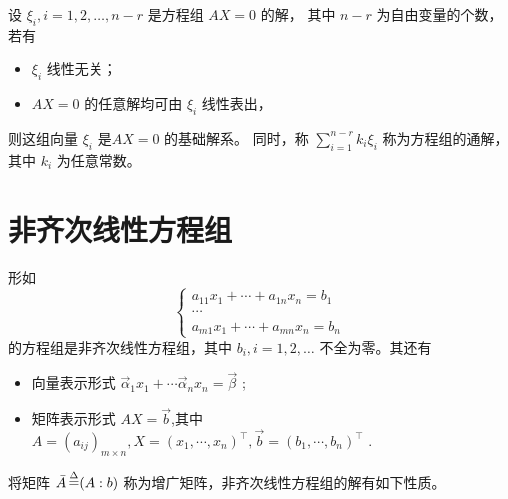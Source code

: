
设 $ \xi_i,i=1,2,\dots,n-r $ 是方程组 $ AX = 0 $ 的解，
其中 $ n - r $ 为自由变量的个数，
若有
\begin{itemize}
    \item $ \xi_i $ 线性无关；
    \item $ AX=0 $ 的任意解均可由 $ \xi_i $ 线性表出，
\end{itemize}
则这组向量 $ \xi_i $ 是$ AX = 0 $ 的基础解系。
同时，称 $ \sum_{i=1}^{n-r}k_i\xi_{i} $ 称为方程组的通解，
其中 $ k_i $ 为任意常数。

\section{非齐次线性方程组}

形如
\begin{equation*}
    \left\{
    \begin{array}{c}
        a_{11}x_1 + \cdots +a_{1n}x_n = b_1\\ 
        \cdots\\ 
        a_{m1}x_1 + \cdots +a_{mn}x_n = b_n
    \end{array}
    \right.
\end{equation*}
的方程组是非齐次线性方程组，其中 $ b_i,i=1,2,\dots $ 不全为零。其还有
\begin{itemize}
    \item 向量表示形式
    $ \vec \alpha_1x_1+\cdots \vec\alpha_n x_n = \vec \beta $ ;
    \item 矩阵表示形式
    $ AX = \vec b$,其中 $ A = (a_{ij})_{m\times n}, X = (x_1,\cdots, x_n)^\top ,\vec b = (b_1,\cdots,b_n)^\top$ .
\end{itemize}


将矩阵 $ \bar A\mathop=\limits^\Delta (A:b) $ 称为增广矩阵，非齐次线性方程组的解有如下性质。

